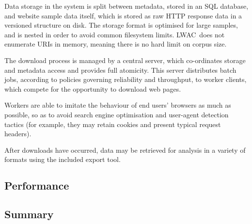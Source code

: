 Data storage in the system is split between metadata, stored in an SQL database, and website sample data itself, which is stored as raw HTTP response data in a versioned structure on disk.  The storage format is optimised for large samples, and is nested in order to avoid common filesystem limits.  LWAC~does not enumerate URIs in memory, meaning there is no hard limit on corpus size.

The download process is managed by a central server, which co-ordinates storage and metadata access and provides full atomicity.  This server distributes batch jobs, according to policies governing reliability and throughput, to worker clients, which compete for the opportunity to download web pages.

Workers are able to imitate the behaviour of end users' browsers as much as possible, so as to avoid search engine optimisation and user-agent detection tactics (for example, they may retain cookies and present typical request headers).

After downloads have occurred, data may be retrieved for analysis in a variety of formats using the included export tool.






\subsection{Performance}


\subsection{Summary}


